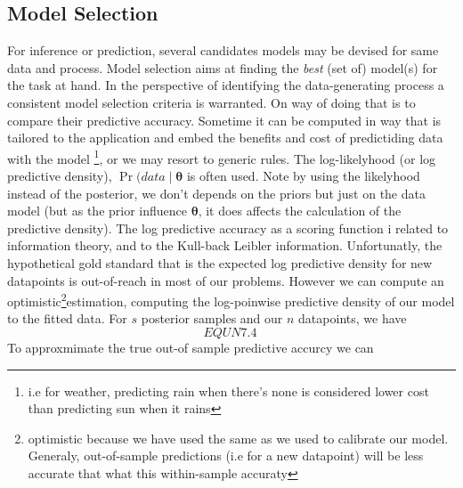 \subsection{Model Selection}
For inference or prediction, several candidates models may be devised for same data and process. Model selection aims at finding the \textit{best} (set of) model(s) for the task at hand. In the perspective of identifying the data-generating process a consistent model selection criteria is warranted\parencite{Hoge:PrimerModelSelection:2018}.  On way of doing that is to compare their predictive accuracy. Sometime it can be computed in way that is tailored to the application and embed the benefits and cost of predictiding data with the model \footnote{i.e for weather, predicting rain when there’s none is considered lower cost than predicting sun when it rains}, or we may resort to generic rules.
The log-likelyhood (or log predictive density), $\Pr(data \mid \boldsymbol\theta$  is often used. Note by using the likelyhood instead of the posterior, we don’t depends on the priors but just on the data model (but as the prior influence $\boldsymbol\theta$, it does affects the calculation of the predictive density). The log predictive accuracy as a scoring function i related to information theory, and to the Kull-back Leibler information.
Unfortunatly, the hypothetical gold standard that is the expected log predictive density for new datapoints is out-of-reach in most of our problems. However we can compute an optimistic\footnote{optimistic because we have used the same as we used to calibrate our model. Generaly, out-of-sample predictions (i.e for a new datapoint) will be less accurate that what this within-sample accuraty}estimation, computing the log-poinwise predictive density of our model to the fitted data. For $s$ posterior samples and our $n$ datapoints, we have
\begin{equation}
	EQUN 7.4~\label{eq:llik}
\end{equation}
To approxmimate the true out-of sample predictive accurcy we can 
